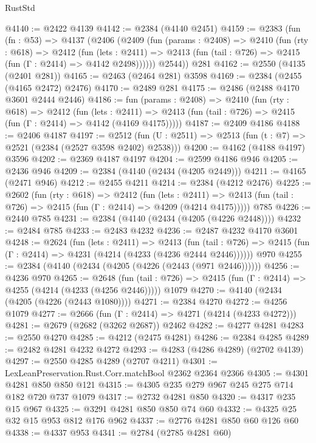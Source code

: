 \begin{lexlean}{RustStd}
\begin{coremodule}
@4140 := @2422 @4139
@4142 := @2384 (@4140 @2451)
@4159 := @2383
    (fun (fn : @53) =>
    @4137
      (@2406
        (@2409
          (fun (params : @2408) =>
          @2410
            (fun (rty : @618) =>
            @2412
              (fun (lets : @2411) =>
              @2413 (fun (tail : @726) => @2415 (fun (Γ : @2414) => @4142 @2498))))))
        @2544))
    @281
@4162 := @2550 (@4135 (@2401 @281))
@4165 := @2463 (@2464 @281) @3598
@4169 := @2384 (@2455 (@4165 @2472) @2476)
@4170 := @2489 @281
@4175 := @2486 (@2488 @4170 @3601 @2444 @2446)
@4186 := fun (params : @2408) =>
  @2410
    (fun (rty : @618) =>
    @2412
      (fun (lets : @2411) =>
      @2413 (fun (tail : @726) => @2415 (fun (Γ : @2414) => @4142 (@4169 @4175)))))
@4187 := @2409 @4186
@4188 := @2406 @4187
@4197 := @2512 (fun (U : @2511) => @2513 (fun (t : @7) => @2521 (@2384 (@2527 @3598 @2402) @2538)))
@4200 := @4162 (@4188 @4197) @3596
@4202 := @2369 @4187 @4197
@4204 := @2599 @4186 @946
@4205 := @2436 @946
@4209 := @2384 (@4140 (@2434 (@4205 @2449)))
@4211 := @4165 (@2471 @946)
@4212 := @2455 @4211
@4214 := @2384 (@4212 @2476)
@4225 := @2602
    (fun (rty : @618) =>
    @2412
      (fun (lets : @2411) =>
      @2413 (fun (tail : @726) => @2415 (fun (Γ : @2414) => @4209 (@4214 @4175)))))
    @785
@4226 := @2440 @785
@4231 := @2384 (@4140 (@2434 (@4205 (@4226 @2448))))
@4232 := @2484 @785
@4233 := @2483 @4232
@4236 := @2487 @4232 @4170 @3601
@4248 := @2624
    (fun (lets : @2411) =>
    @2413
      (fun (tail : @726) => @2415 (fun (Γ : @2414) => @4231 (@4214 (@4233 (@4236 @2444 @2446))))))
    @970
@4255 := @2384 (@4140 (@2434 (@4205 (@4226 (@2443 (@971 @2446))))))
@4256 := @4236 @970
@4265 := @2648
    (fun (tail : @726) => @2415 (fun (Γ : @2414) => @4255 (@4214 (@4233 (@4256 @2446)))))
    @1079
@4270 := @4140 (@2434 (@4205 (@4226 (@2443 @1080))))
@4271 := @2384 @4270
@4272 := @4256 @1079
@4277 := @2666 (fun (Γ : @2414) => @4271 (@4214 (@4233 @4272)))
@4281 := @2679 (@2682 (@3262 @2687)) @2462
@4282 := @4277 @4281
@4283 := @2550 @4270
@4285 := @4212 (@2475 @4281)
@4286 := @2384 @4285
@4289 := @2482 @4281 @4232 @4272
@4293 := @4283 (@4286 @4289) (@2702 @4139)
@4297 := @2550 @4285 @4289 (@2707 @4211)
@4301 := LexLeanPreservation.Rust.Corr.matchBool @2362 @2364 @2366
@4305 := @4301 @4281 @850 @850 @121
@4315 := @4305 @235 @279 @967 @245 @275 @714 @182 @720 @737 @1079
@4317 := @2732 @4281 @850
@4320 := @4317 @235 @15 @967
@4325 := @3291 @4281 @850 @850 @74 @60
@4332 := @4325 @25 @32 @15 @953 @812 @176 @962
@4337 := @2776 @4281 @850 @60 @126 @60
@4338 := @4337 @953
@4341 := @2784 (@2785 @4281 @60)

\end{coremodule}
\end{lexlean}
